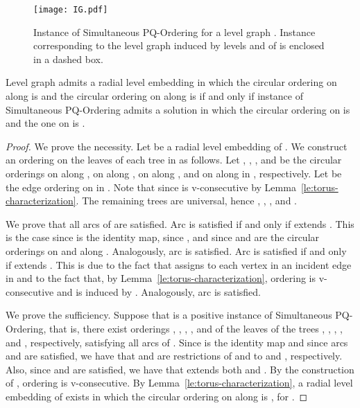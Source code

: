 \documentclass{llncs}
\begin{document}
\begin{figure}[tb]
\centering
\texttt{[image: IG.pdf]}
\caption{Instance  of {\sc Simultaneous PQ-Ordering} for a level graph . Instance  corresponding to the level graph  induced by levels  and  of  is enclosed in a dashed box.}
\label{fig:simpq-instance}
\end{figure}

\begin{lemma}\label{le:equivalence}
Level graph  admits a radial level embedding in which the circular ordering on  along  is  and the circular ordering on  along  is  if and only if instance  of {\sc Simultaneous PQ-Ordering} admits a solution in which the circular ordering on  is  and the one on  is .
\end{lemma}

\begin{proof}
We prove the necessity. Let  be a radial level embedding of . We construct an ordering on the leaves of each tree in  as follows. Let , , , and  be the circular orderings on  along , on  along , on  along , and on  along  in , respectively. Let  be the edge ordering on  in . Note that  since  is v-consecutive by Lemma~\ref{le:torus-characterization}. The remaining trees are universal, hence , , , and . 

We prove that all arcs of  are satisfied. Arc  is satisfied if and only if  extends . This is the case since  is the identity map, since , and since  and  are the circular orderings on  and  along . Analogously, arc  is satisfied. Arc  is satisfied if and only if  extends . This is due to the fact that  assigns to each vertex in  an incident edge in  and to the fact that, by Lemma~\ref{le:torus-characterization}, ordering  is v-consecutive and  is induced by . Analogously, arc  is satisfied.  

We prove the sufficiency. Suppose that  is a positive instance of {\sc Simultaneous PQ-Ordering}, that is, there exist orderings , , , , and  of the leaves of the trees , , , , and , respectively, satisfying all arcs of . 
Since  is the identity map and since arcs  and  are satisfied, we have that  and  are restrictions of  and  to  and , respectively. Also, since  and  are satisfied, we have that  extends both  and . By the construction of , ordering  is v-consecutive. By Lemma~\ref{le:torus-characterization}, a radial level embedding  of  exists in which the circular ordering on  along  is , for .
\end{proof}
\end{document}
